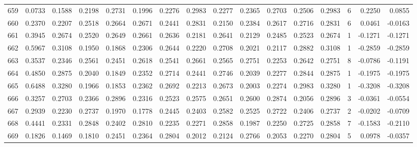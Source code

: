 \begin{tabular}{lrrrrrrrrrrrrrrr}
659 &      0.0733 &  0.1588 &  0.2198 &  0.2731 &  0.1996 &  0.2276 &  0.2983 &  0.2277 &  0.2365 &  0.2703 &   0.2506 &     0.2983 &      6 &                    0.2250 &                     0.0855 \\
660 &      0.2370 &  0.2207 &  0.2518 &  0.2664 &  0.2671 &  0.2441 &  0.2831 &  0.2150 &  0.2384 &  0.2617 &   0.2716 &     0.2831 &      6 &                    0.0461 &                    -0.0163 \\
661 &      0.3945 &  0.2674 &  0.2520 &  0.2649 &  0.2661 &  0.2636 &  0.2181 &  0.2641 &  0.2129 &  0.2485 &   0.2523 &     0.2674 &      1 &                   -0.1271 &                    -0.1271 \\
662 &      0.5967 &  0.3108 &  0.1950 &  0.1868 &  0.2306 &  0.2644 &  0.2220 &  0.2708 &  0.2021 &  0.2117 &   0.2882 &     0.3108 &      1 &                   -0.2859 &                    -0.2859 \\
663 &      0.3537 &  0.2346 &  0.2561 &  0.2451 &  0.2618 &  0.2541 &  0.2661 &  0.2565 &  0.2751 &  0.2253 &   0.2642 &     0.2751 &      8 &                   -0.0786 &                    -0.1191 \\
664 &      0.4850 &  0.2875 &  0.2040 &  0.1849 &  0.2352 &  0.2714 &  0.2441 &  0.2746 &  0.2039 &  0.2277 &   0.2844 &     0.2875 &      1 &                   -0.1975 &                    -0.1975 \\
665 &      0.6488 &  0.3280 &  0.1966 &  0.1853 &  0.2362 &  0.2692 &  0.2213 &  0.2673 &  0.2003 &  0.2274 &   0.2983 &     0.3280 &      1 &                   -0.3208 &                    -0.3208 \\
666 &      0.3257 &  0.2703 &  0.2366 &  0.2896 &  0.2316 &  0.2523 &  0.2575 &  0.2651 &  0.2600 &  0.2874 &   0.2056 &     0.2896 &      3 &                   -0.0361 &                    -0.0554 \\
667 &      0.2939 &  0.2230 &  0.2737 &  0.1970 &  0.1778 &  0.2445 &  0.2403 &  0.2582 &  0.2525 &  0.2722 &   0.2406 &     0.2737 &      2 &                   -0.0202 &                    -0.0709 \\
668 &      0.4441 &  0.2331 &  0.2848 &  0.2402 &  0.2810 &  0.2235 &  0.2271 &  0.2858 &  0.1987 &  0.2250 &   0.2725 &     0.2858 &      7 &                   -0.1583 &                    -0.2110 \\
669 &      0.1826 &  0.1469 &  0.1810 &  0.2451 &  0.2364 &  0.2804 &  0.2012 &  0.2124 &  0.2766 &  0.2053 &   0.2270 &     0.2804 &      5 &                    0.0978 &                    -0.0357 \\

\end{tabular}
